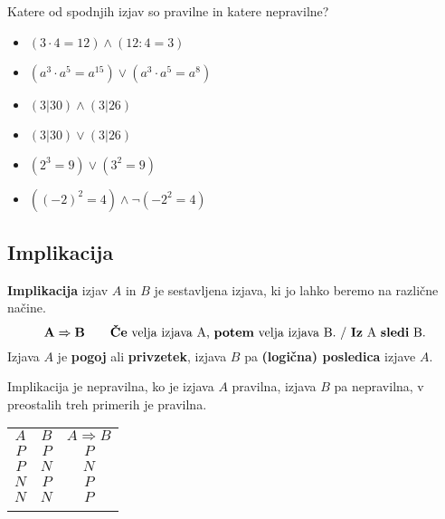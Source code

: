         
         

         
             \begin{naloga}
                Katere od spodnjih izjav so pravilne in katere nepravilne?
                \begin{itemize}
                    \item $(3\cdot 4 = 12)\land(12:4=3)$
                    \item $(a^3\cdot a^5=a^{15})\lor (a^3\cdot a^5=a^8)$
                    \item $(3|30)\land(3|26)$
                    \item $(3|30)\lor(3|26)$
                    \item $(2^3=9)\lor(3^2=9)$
                    \item $((-2)^2=4)\land\lnot(-2^2=4)$
                \end{itemize}
            \end{naloga}
         

         
             \subsection{Implikacija}
                \textbf{Implikacija} izjav $A$ in $B$ je sestavljena izjava, ki jo lahko beremo
                na različne načine.
                $$ \mathbf{A\Rightarrow B} \quad \quad \textmd{\textbf{Če} velja izjava A, 
                \textbf{potem} velja izjava B. / \textbf{Iz} A \textbf{sledi} B.}$$
                Izjava $A$ je \textbf{pogoj} ali \textbf{privzetek}, izjava $B$ pa 
                \textbf{(logična) posledica} izjave $A$.
             
                      
                        Implikacija je nepravilna, ko je izjava $A$ pravilna, izjava $B$ pa 
                        nepravilna, v preostalih treh primerih je pravilna.
                     

                    \begin{table}[H]
                        \centering
                        \begin{tabular}{||c|c|c||} 
                        \hhline{|t:===:t|}
                        \rowcolor[rgb]{0.843,0.718,0.718} $A$ & $B$ & $A\Rightarrow B$  \\ 
                        \hhline{|:===:|}
                        $P$ & $P$ & $P$                         \\ 
                        \hline
                        $P$ & $N$ & $N$                         \\ 
                        \hline
                        $N$ & $P$ & $P$                         \\ 
                        \hline
                        $N$ & $N$ & $P$                         \\
                        \hhline{|b:===:b|}
                        \end{tabular}
                    \end{table}

